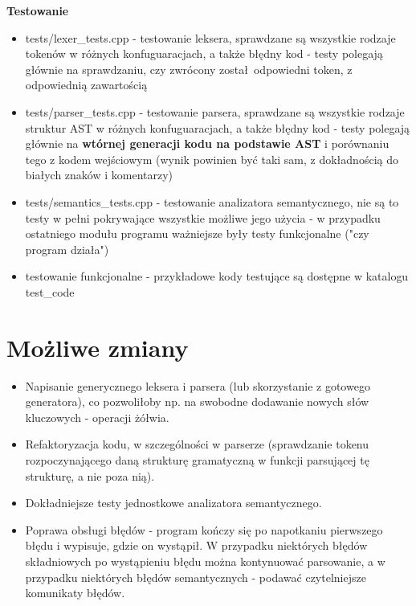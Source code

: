 \documentclass{article}
\begin{document}
\textbf{Testowanie}
\begin{itemize}
    \item{tests/lexer\_tests.cpp - testowanie leksera, sprawdzane są wszystkie rodzaje tokenów w różnych konfuguaracjach, a także błędny kod - testy polegają głównie na sprawdzaniu, czy zwrócony został odpowiedni token, z odpowiednią zawartością}
    \item{tests/parser\_tests.cpp - testowanie parsera, sprawdzane są wszystkie rodzaje struktur AST w różnych konfuguaracjach, a także błędny kod - testy polegają głównie na \textbf{wtórnej generacji kodu na podstawie AST} i porównaniu tego z kodem wejściowym (wynik powinien być taki sam, z dokładnością do białych znaków i komentarzy)}
    \item{tests/semantics\_tests.cpp - testowanie analizatora semantycznego, nie są to testy w pełni pokrywające wszystkie możliwe jego użycia - w przypadku ostatniego modułu programu ważniejsze były testy funkcjonalne ("czy program działa")}
    \item{testowanie funkcjonalne - przykładowe kody testujące są dostępne w katalogu test\_code}
\end{itemize}

\section{Możliwe zmiany}

\begin{itemize}
    \item{Napisanie generycznego leksera i parsera (lub skorzystanie z gotowego generatora), co pozwoliłoby np. na swobodne dodawanie nowych słów kluczowych - operacji żółwia.}
    \item{Refaktoryzacja kodu, w szczególności w parserze (sprawdzanie tokenu rozpoczynającego daną strukturę gramatyczną w funkcji parsującej tę strukturę, a nie poza nią).}
    \item{Dokładniejsze testy jednostkowe analizatora semantycznego.}
    \item{Poprawa obsługi błędów - program kończy się po napotkaniu pierwszego błędu i wypisuje, gdzie on wystąpił. W przypadku niektórych błędów składniowych po wystąpieniu błędu można kontynuować parsowanie, a w przypadku niektórych błędów semantycznych - podawać czytelniejsze komunikaty błędów.}
\end{itemize}
\end{document}
